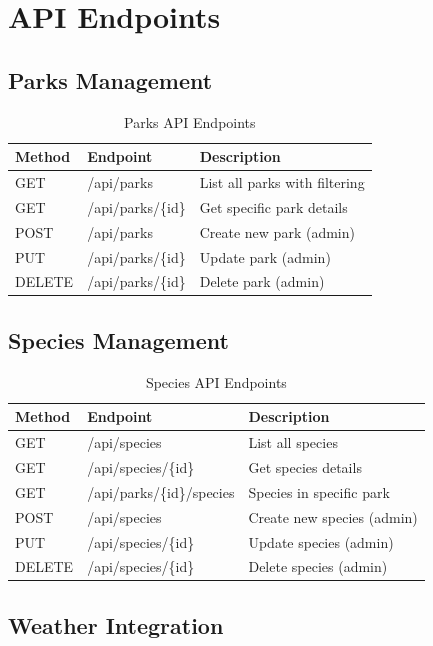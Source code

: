 \documentclass[12pt,a4paper]{report}
\begin{document}
\section{API Endpoints}

\subsection{Parks Management}

\begin{table}[H]
\centering
\caption{Parks API Endpoints}
\label{tab:parks-endpoints}
\begin{tabular}{@{}lll@{}}
\toprule
Method & Endpoint & Description \\
\midrule
GET & /api/parks & List all parks with filtering \\
GET & /api/parks/\{id\} & Get specific park details \\
POST & /api/parks & Create new park (admin) \\
PUT & /api/parks/\{id\} & Update park (admin) \\
DELETE & /api/parks/\{id\} & Delete park (admin) \\
\bottomrule
\end{tabular}
\end{table}

\subsection{Species Management}

\begin{table}[H]
\centering
\caption{Species API Endpoints}
\label{tab:species-endpoints}
\begin{tabular}{@{}lll@{}}
\toprule
Method & Endpoint & Description \\
\midrule
GET & /api/species & List all species \\
GET & /api/species/\{id\} & Get species details \\
GET & /api/parks/\{id\}/species & Species in specific park \\
POST & /api/species & Create new species (admin) \\
PUT & /api/species/\{id\} & Update species (admin) \\
DELETE & /api/species/\{id\} & Delete species (admin) \\
\bottomrule
\end{tabular}
\end{table}

\subsection{Weather Integration}
\end{document}
